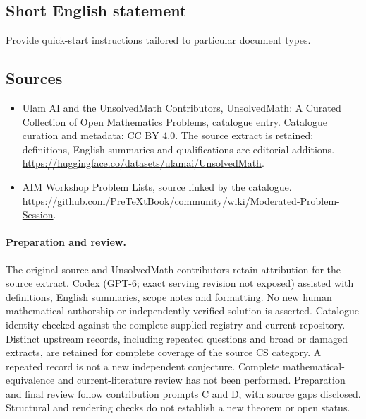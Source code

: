 \documentclass[11pt]{article}
\begin{document}
\subsection{Short English statement}
Provide quick-start instructions tailored to particular document types.
\subsection{Sources}
\begin{itemize}
\item[\hypertarget{source:statement:1}{S1}] Ulam AI and the UnsolvedMath Contributors, UnsolvedMath: A Curated Collection of Open Mathematics Problems, catalogue entry. Catalogue curation and metadata: CC BY 4.0. The source extract is retained; definitions, English summaries and qualifications are editorial additions.
\url{https://huggingface.co/datasets/ulamai/UnsolvedMath}.
\item[\hypertarget{source:statement:2}{S2}] AIM Workshop Problem Lists, source linked by the catalogue.
\url{https://github.com/PreTeXtBook/community/wiki/Moderated-Problem-Session}.
\end{itemize}
\paragraph{Preparation and review.}
The original source and UnsolvedMath contributors retain attribution for the source extract. Codex (GPT-6; exact serving revision not exposed) assisted with definitions, English summaries, scope notes and formatting. No new human mathematical authorship or independently verified solution is asserted. Catalogue identity checked against the complete supplied registry and current repository. Distinct upstream records, including repeated questions and broad or damaged extracts, are retained for complete coverage of the source CS category. A repeated record is not a new independent conjecture. Complete mathematical-equivalence and current-literature review has not been performed. Preparation and final review follow contribution prompts C and D, with source gaps disclosed. Structural and rendering checks do not establish a new theorem or open status.
\label{end:statement}
\end{document}
